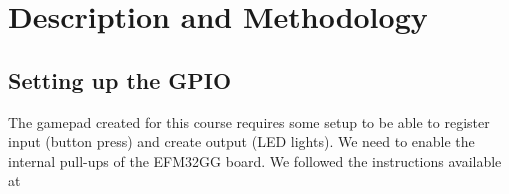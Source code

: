 \section{Description and Methodology}
\subsection{Setting up the GPIO}
The gamepad created for this course requires some setup to be able to register input (button press) and create output (LED lights). We need to enable the internal pull-ups of the EFM32GG board. We followed the instructions available at \cite[p. 24]{compendium}

\begin{figure}[h]
	
\end{figure}
